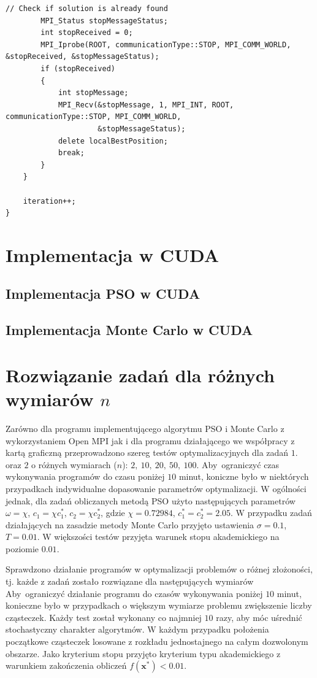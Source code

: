 \documentclass[11pt, a4paper, oneside]{article}
\newcommand{\vect}[1]{\bm{\mathbf{#1}}}
\begin{document}
\begin{lstlisting}[style=mycpp, label=code:pso_before, caption={Schemat komunikacji MPI w metodzie Monte Carlo.}]
        // Check if solution is already found
        MPI_Status stopMessageStatus;
        int stopReceived = 0;
        MPI_Iprobe(ROOT, communicationType::STOP, MPI_COMM_WORLD, &stopReceived, &stopMessageStatus);
        if (stopReceived)
        {
            int stopMessage;
            MPI_Recv(&stopMessage, 1, MPI_INT, ROOT, communicationType::STOP, MPI_COMM_WORLD,
                     &stopMessageStatus);
            delete localBestPosition;
            break;
        }
    }

    iteration++;
}
\end{lstlisting}
        
        
\section{Implementacja w CUDA}

\subsection{Implementacja PSO w CUDA}

\subsection{Implementacja Monte Carlo w CUDA}

\section{Rozwiązanie zadań dla różnych wymiarów $n$}

Zarówno dla programu implementującego algorytmu PSO i Monte Carlo z wykorzystaniem Open MPI jak i dla programu działającego we współpracy z kartą graficzną przeprowadzono szereg testów optymalizacyjnych dla zadań $1$. oraz $2$ o różnych wymiarach ($n$): $2, \ 10, \ 20, \ 50, \ 100$. Aby~ograniczyć czas wykonywania programów do czasu poniżej $10$ minut, koniczne było w niektórych przypadkach indywidualne dopasowanie parametrów optymalizacji. W ogólności jednak, dla zadań obliczanych metodą PSO użyto następujących parametrów $\omega = \chi$, $c_1 = \chi c_1^*$, $c_2 = \chi c_2^*$, gdzie $\chi = 0.72984$, $c_1^* = c_2^* = 2.05$. W przypadku zadań działających na zasadzie metody Monte Carlo przyjęto ustawienia $\sigma = 0.1$, $T = 0.01$. W większości testów przyjęta warunek stopu akademickiego na poziomie $0.01$.

Sprawdzono działanie programów w optymalizacji problemów o różnej złożoności, tj. każde z zadań zostało rozwiązane dla następujących wymiarów  Aby~ograniczyć działanie programu do czasów wykonywania poniżej $10$ minut, konieczne było w przypadkach o większym wymiarze problemu zwiększenie liczby cząsteczek. Każdy test został wykonany co najmniej $10$ razy, aby móc uśrednić stochastyczny charakter algorytmów. W każdym przypadku położenia początkowe cząsteczek losowane z rozkładu jednostajnego na całym dozwolonym obszarze. Jako kryterium stopu przyjęto kryterium typu akademickiego z warunkiem zakończenia obliczeń $f\left(\vect{x}^{*}\right) < 0.01$.
\end{document}
